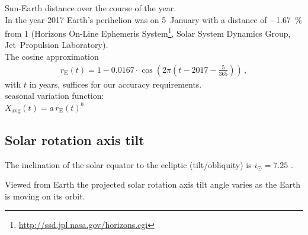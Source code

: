 Sun-Earth distance over the course of the year.\\
In the year 2017 Earth's perihelion was on 5~January with a distance of \SI{-1.67}{\percent} from \SI{1}{\au} (Horizons On-Line Ephemeris System\footnote{\url{http://ssd.jpl.nasa.gov/horizons.cgi}}, Solar System Dynamics Group, Jet~Propulsion Laboratory).\\
The cosine approximation
\begin{align}
	r_\text{E}(t) = 1 - 0.0167 \cdot \cos\left(2 \pi \left(t - 2017 - \frac{5}{365}\right)\right)\,,
\end{align}
with $t$ in years, suffices for our accuracy requirements.\\

seasonal variation function:\\
$X_\text{avg}(t) = a\,r_\text{E}(t)^b$\\

\subsection{Solar rotation axis tilt}

The inclination of the solar equator to the ecliptic (tilt/obliquity) is $i_\odot = 7.25$\textdegree{} \citep{USNO2015}. %

Viewed from Earth the projected solar rotation axis tilt angle varies as the Earth is moving on its orbit.\\

